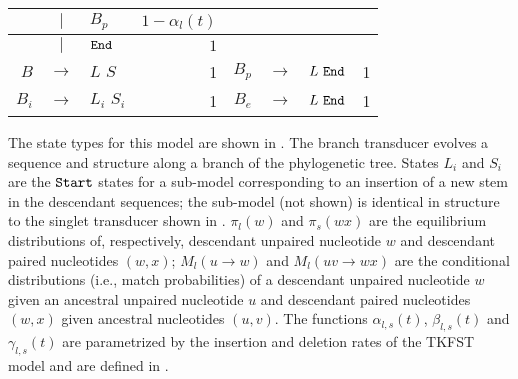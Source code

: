 \documentclass[10pt]{article}
\begin{document}
\begin{table}[!ht]
\begin{tabular}{|rcl|r||rcl|r|}
    & $|$ & $B_p$ & $1-\alpha_l(t)$ & & & &  \\ \hline
    & $|$ & $\mathtt{End}$ & $1$ & & & &  \\ \hline \hline
    $B$ & $\rightarrow$ & $L \,\, S$ & 1 & $B_p$ & $\rightarrow$ & $L \, \, \mathtt{End}$ & 1 \\ \hline
    $B_i$ & $\rightarrow$ & $L_i \,\, S_i$ & 1 & $B_e$ & $\rightarrow$ & $L \, \, \mathtt{End}$ & 1 \\ \hline \hline
  \end{tabular}
  \begin{flushleft}
    The state types for this model are shown in
    . The branch transducer evolves a
    sequence and structure along a branch of the phylogenetic
    tree. States $L_i$ and $S_i$ are the $\mathtt{Start}$ states for a
    sub-model corresponding to an insertion of a new stem in the
    descendant sequences; the sub-model (not shown) is identical in
    structure to the singlet transducer shown in
    . $\pi_l(w)$ and $\pi_s(wx)$ are the
    equilibrium distributions of, respectively, descendant unpaired
    nucleotide $w$ and descendant paired nucleotides $(w,x)$;
    $M_l(u \rightarrow w)$ and $M_l(uv \rightarrow wx)$ are the conditional distributions
    (i.e., match probabilities) of a descendant unpaired
    nucleotide $w$ given an ancestral unpaired nucleotide $u$ and
    descendant paired nucleotides $(w,x)$ given ancestral nucleotides
    $(u,v)$. The functions $\alpha_{l,s}(t)$, $\beta_{l,s}(t)$ and
    $\gamma_{l,s}(t)$ are parametrized by the insertion and deletion rates
    of the TKFST model and are defined in .
  \end{flushleft}
\end{table}


\end{document}
